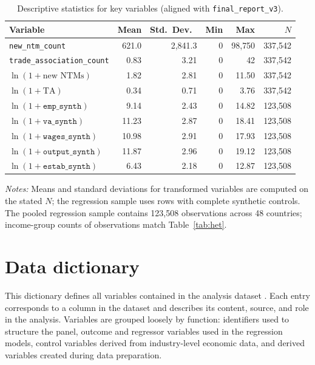\documentclass[12pt,letterpaper]{article}
\newenvironment{tablenotes}{%
  \par\vspace{0.35em}%
  \begingroup
  \raggedright
  \footnotesize
  \begin{singlespace}%
}{%
  \end{singlespace}%
  \endgroup
  \par
}
\newcommand{\Nreg}{123{,}508}
\newcommand{\CountriesReg}{48}
\begin{document}
\begin{table}[htbp]
  \centering
  \small
  \caption{Descriptive statistics for key variables (aligned with \texttt{final\_report\_v3}).}
  \label{tab:desc}
  \begin{tabular}{@{}lrrrrr@{}}
    \toprule
    Variable & Mean & Std.\ Dev.\ & Min & Max & $N$ \\
    \midrule
    \texttt{new\_ntm\_count} & 621.0 & 2{,}841.3 & 0 & 98{,}750 & 337{,}542 \\
    \texttt{trade\_association\_count} & 0.83 & 3.21 & 0 & 42 & 337{,}542 \\
    $\ln(1+\text{new NTMs})$ & 1.82 & 2.81 & 0 & 11.50 & 337{,}542 \\
    $\ln(1+\text{TA})$ & 0.34 & 0.71 & 0 & 3.76 & 337{,}542 \\
    $\ln(1+\texttt{emp\_synth})$ & 9.14 & 2.43 & 0 & 14.82 & 123{,}508 \\
    $\ln(1+\texttt{va\_synth})$ & 11.23 & 2.87 & 0 & 18.41 & 123{,}508 \\
    $\ln(1+\texttt{wages\_synth})$ & 10.98 & 2.91 & 0 & 17.93 & 123{,}508 \\
    $\ln(1+\texttt{output\_synth})$ & 11.87 & 2.96 & 0 & 19.12 & 123{,}508 \\
    $\ln(1+\texttt{estab\_synth})$ & 6.43 & 2.18 & 0 & 12.87 & 123{,}508 \\
    \bottomrule
  \end{tabular}
\begin{tablenotes}
\noindent\textit{Notes:} Means and standard deviations for transformed variables are computed on the stated $N$; the regression sample uses rows with complete synthetic controls. The pooled regression sample contains \Nreg{} observations across \CountriesReg{} countries; income-group counts of observations match Table~\ref{tab:het}.
\end{tablenotes}
\end{table}

\section{Data dictionary}
\label{app:datadict}
\begingroup
\footnotesize
\setlength{\parskip}{0.55em}
\setlength{\parindent}{0pt}
\raggedright

\noindent
This dictionary defines all variables contained in the analysis dataset .
Each entry corresponds to a column in the dataset and describes its content, source, and role in
the analysis. Variables are grouped loosely by function: identifiers used to structure the panel,
outcome and regressor variables used in the regression models, control variables derived from
industry-level economic data, and derived variables created during data preparation.
\end{document}
